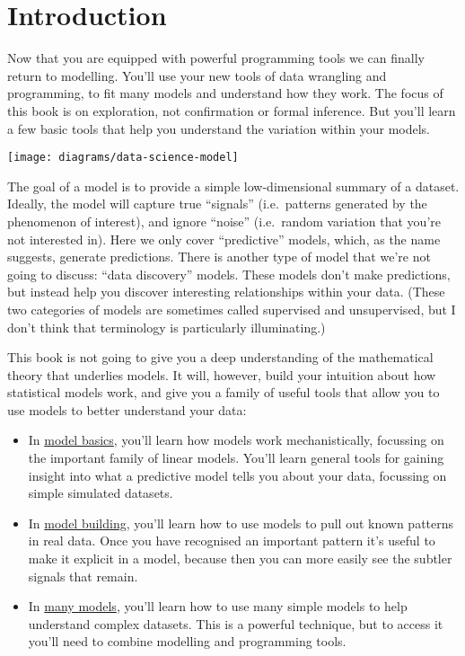 \documentclass[]{book}
\begin{document}
\hypertarget{model-intro}{\chapter{Introduction}\label{model-intro}}

Now that you are equipped with powerful programming tools we can finally
return to modelling. You'll use your new tools of data wrangling and
programming, to fit many models and understand how they work. The focus
of this book is on exploration, not confirmation or formal inference.
But you'll learn a few basic tools that help you understand the
variation within your models.

\begin{center}\texttt{[image: diagrams/data-science-model]} \end{center}

The goal of a model is to provide a simple low-dimensional summary of a
dataset. Ideally, the model will capture true ``signals'' (i.e.~patterns
generated by the phenomenon of interest), and ignore ``noise''
(i.e.~random variation that you're not interested in). Here we only
cover ``predictive'' models, which, as the name suggests, generate
predictions. There is another type of model that we're not going to
discuss: ``data discovery'' models. These models don't make predictions,
but instead help you discover interesting relationships within your
data. (These two categories of models are sometimes called supervised
and unsupervised, but I don't think that terminology is particularly
illuminating.)

This book is not going to give you a deep understanding of the
mathematical theory that underlies models. It will, however, build your
intuition about how statistical models work, and give you a family of
useful tools that allow you to use models to better understand your
data:

\begin{itemize}
\item
  In \protect\hyperlink{model-basics}{model basics}, you'll learn how
  models work mechanistically, focussing on the important family of
  linear models. You'll learn general tools for gaining insight into
  what a predictive model tells you about your data, focussing on simple
  simulated datasets.
\item
  In \protect\hyperlink{model-building}{model building}, you'll learn
  how to use models to pull out known patterns in real data. Once you
  have recognised an important pattern it's useful to make it explicit
  in a model, because then you can more easily see the subtler signals
  that remain.
\item
  In \protect\hyperlink{many-models}{many models}, you'll learn how to
  use many simple models to help understand complex datasets. This is a
  powerful technique, but to access it you'll need to combine modelling
  and programming tools.
\end{itemize}
\end{document}
